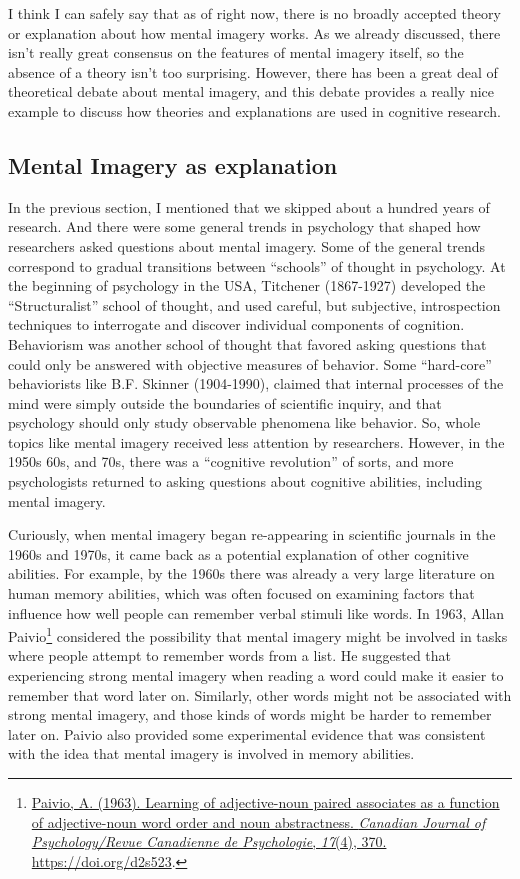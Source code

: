 \documentclass[
  oneside,
  12pt]{crumpbook}
\begin{document}
I think I can safely say that as of right now, there is no broadly accepted theory or explanation about how mental imagery works. As we already discussed, there isn't really great consensus on the features of mental imagery itself, so the absence of a theory isn't too surprising. However, there has been a great deal of theoretical debate about mental imagery, and this debate provides a really nice example to discuss how theories and explanations are used in cognitive research.

\hypertarget{mental-imagery-as-explanation}{%
\subsection{Mental Imagery as explanation}\label{mental-imagery-as-explanation}}

In the previous section, I mentioned that we skipped about a hundred years of research. And there were some general trends in psychology that shaped how researchers asked questions about mental imagery. Some of the general trends correspond to gradual transitions between ``schools'' of thought in psychology. At the beginning of psychology in the USA, Titchener (1867-1927) developed the ``Structuralist'' school of thought, and used careful, but subjective, introspection techniques to interrogate and discover individual components of cognition. Behaviorism was another school of thought that favored asking questions that could only be answered with objective measures of behavior. Some ``hard-core'' behaviorists like B.F. Skinner (1904-1990), claimed that internal processes of the mind were simply outside the boundaries of scientific inquiry, and that psychology should only study observable phenomena like behavior. So, whole topics like mental imagery received less attention by researchers. However, in the 1950s 60s, and 70s, there was a ``cognitive revolution'' of sorts, and more psychologists returned to asking questions about cognitive abilities, including mental imagery.

Curiously, when mental imagery began re-appearing in scientific journals in the 1960s and 1970s, it came back as a potential explanation of other cognitive abilities. For example, by the 1960s there was already a very large literature on human memory abilities, which was often focused on examining factors that influence how well people can remember verbal stimuli like words. In 1963, Allan Paivio\footnote{\protect\hyperlink{ref-paivioLearningAdjectivenounPaired1963}{Paivio, A. (1963). Learning of adjective-noun paired associates as a function of adjective-noun word order and noun abstractness. \emph{Canadian Journal of Psychology/Revue Canadienne de Psychologie}, \emph{17}(4), 370. \url{https://doi.org/d2s523}}.} considered the possibility that mental imagery might be involved in tasks where people attempt to remember words from a list. He suggested that experiencing strong mental imagery when reading a word could make it easier to remember that word later on. Similarly, other words might not be associated with strong mental imagery, and those kinds of words might be harder to remember later on. Paivio also provided some experimental evidence that was consistent with the idea that mental imagery is involved in memory abilities.
\end{document}
